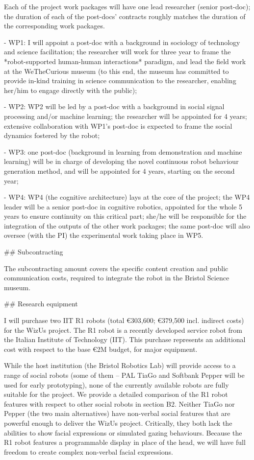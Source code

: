 \documentclass[11pt,a4paper]{report}
\begin{document}
Each of the project work packages will have one lead researcher (senior post-doc); the duration of each
 of the post-docs' contracts roughly matches the duration of the corresponding work packages.

-   WP1: I will appoint a post-doc with a background in sociology of technology and science facilitation;
    the researcher will work for three year to frame the *robot-supported human-human interactions*
    paradigm, and lead the field work at the WeTheCurious museum (to this end, the museum has committed
    to provide in-kind training in science communication to the researcher, enabling her/him to engage 
    directly with the public);

-   WP2: WP2 will be led by a post-doc with a background in social signal processing and/or machine 
    learning; the researcher will be appointed for 4 years; extensive collaboration with WP1's post-doc
    is expected to frame the social dynamics fostered by the robot;

-   WP3: one post-doc (background in learning from demonstration and machine learning) will be in charge 
    of developing the novel continuous robot behaviour generation method, and will be appointed for 4 years, 
    starting on the second year;

-   WP4: WP4 (the cognitive architecture) lays at the core of the project; the WP4 leader will be a senior 
    post-doc in cognitive robotics, appointed for the whole 5 years to ensure continuity on this critical part; 
    she/he will be responsible for the integration of the outputs of the other work packages; the same post-doc will
    also oversee (with the PI) the experimental work taking place in WP5.

## Subcontracting

The subcontracting amount covers the specific content creation and public communication costs, required to 
integrate the robot in the Bristol Science museum.

## Research equipment

I will purchase two IIT R1 robots (total €303,600; €379,500 incl. indirect costs) for the WizUs project. The R1 robot is 
a recently developed service robot from the Italian Institute of Technology (IIT). This purchase represents an 
additional cost with respect to the base €2M budget, for major equipment.

While the host institution (the Bristol Robotics Lab) will provide access to a range of social robots (some 
of them -- PAL TiaGo and Softbank Pepper will be used for early prototyping), none of the currently available
robots are fully suitable for the project. We provide a detailed comparison of the R1 robot features with respect 
to other social robots in section  B2. Neither TiaGo nor Pepper (the two main alternatives) have non-verbal social
features that are powerful enough to deliver the WizUs project. Critically, they both lack the abilities to show
facial expressions or simulated gazing behaviours. Because the R1 robot features a programmable display in 
place of the head, we will have full freedom to create complex non-verbal facial expressions.
\end{document}
